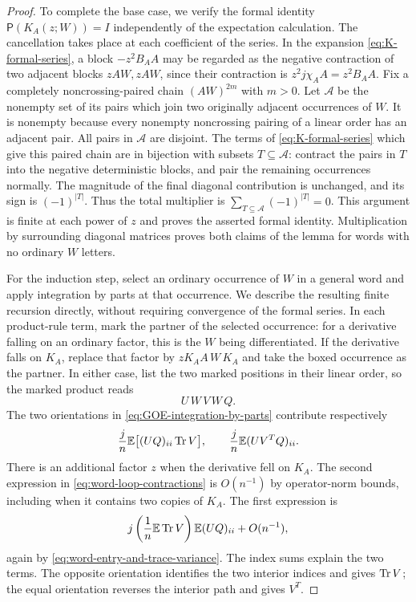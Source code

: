 \begin{proof}
To complete the base case, we verify the formal identity
$\mathsf P(K_A(z;W))=I$ independently of the expectation calculation.
The cancellation takes place at each coefficient of the series.
In the expansion
\eqref{eq:K-formal-series}, a block $-z^2B_AA$ may be regarded as
the negative contraction of two adjacent blocks $zAW,zAW$, since
their contraction is $z^2j\chi_AA=z^2B_AA$.
Fix a completely noncrossing-paired chain $(AW)^{2m}$ with $m>0$.
Let $\mathcal A$ be the nonempty set of its pairs which join two
originally adjacent occurrences of $W$.  It is nonempty because
every nonempty noncrossing pairing of a linear order has an
adjacent pair.  All pairs in $\mathcal A$ are disjoint.  The terms
of \eqref{eq:K-formal-series} which give this paired chain are in
bijection with subsets $T\subseteq\mathcal A$: contract the pairs
in $T$ into the negative deterministic blocks, and pair the
remaining occurrences normally.  The magnitude of the final
diagonal contribution is unchanged, and its sign is $(-1)^{|T|}$.
Thus the total multiplier is
$\sum_{T\subseteq\mathcal A}(-1)^{|T|}=0$.  This argument is finite
at each power of $z$ and proves the asserted formal identity.
Multiplication by surrounding diagonal matrices proves both
claims of the lemma for words with no ordinary $W$ letters.

For the induction step, select an ordinary occurrence of $W$ in
a general word and apply integration by parts at that occurrence.
We describe the resulting finite recursion directly, without
requiring convergence of the formal series.  In each product-rule
term, mark the partner of the selected occurrence: for a derivative
falling on an ordinary factor, this is the $W$ being differentiated.
If the derivative falls on $K_A$, replace that factor by
$zK_AA\,\boxed W\,K_A$ and take the boxed occurrence as the
partner.  In either case, list the two marked positions in their
linear order, so the marked product reads
\[
 U\,\boxed W\,V\,\boxed W\,Q.
\]
The two orientations in \eqref{eq:GOE-integration-by-parts}
contribute respectively
\begin{equation}\label{eq:word-loop-contractions}
 \frac jn\mathbb E\bigl[(UQ)_{ii}\operatorname{Tr} V\bigr],\qquad
 \frac jn\mathbb E(UV^TQ)_{ii}.
\end{equation}
There is an additional factor $z$ when the derivative fell on
$K_A$.  The second expression in
\eqref{eq:word-loop-contractions} is $O(n^{-1})$ by operator-norm
bounds, including when it contains two copies of $K_A$.
The first expression is
\begin{equation}\label{eq:word-loop-leading}
 j\left(\frac1n\mathbb E\operatorname{Tr} V\right)\mathbb E(UQ)_{ii}+O(n^{-1}),
\end{equation}
again by \eqref{eq:word-entry-and-trace-variance}.  The index sums
explain the two terms.  The opposite orientation
identifies the two interior indices and gives $\operatorname{Tr} V$; the equal
orientation reverses the interior path and gives $V^T$.


\end{proof}
